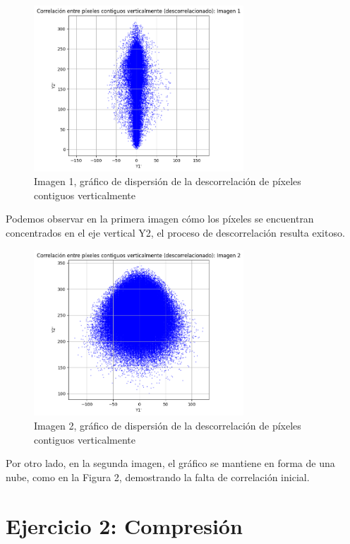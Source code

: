 \documentclass[a4paper,12pt]{article}
\begin{document}
\begin{figure}[H]
    \centering
    \includegraphics[width=0.7\textwidth]{Ejercicio1c.png}
    \caption{Imagen 1, gráfico de dispersión de la descorrelación de píxeles contiguos verticalmente}
    \label{fig:descorrelacion1}
\end{figure}
\vspace{-1em}
Podemos observar en la primera imagen cómo los píxeles se encuentran concentrados en el eje vertical Y2, el proceso de descorrelación resulta exitoso.
\vspace{-1em}
\begin{figure}[H]
    \centering
    \includegraphics[width=0.7\textwidth]{Ejercicio1d.png}
    \caption{Imagen 2, gráfico de dispersión de la descorrelación de píxeles contiguos verticalmente}
    \label{fig:descorrelacion2}
\end{figure}

Por otro lado, en la segunda imagen, el gráfico se mantiene en forma de una nube, como en la Figura 2, demostrando la falta de correlación inicial.
\newpage
\section*{Ejercicio 2: Compresión}
\end{document}

